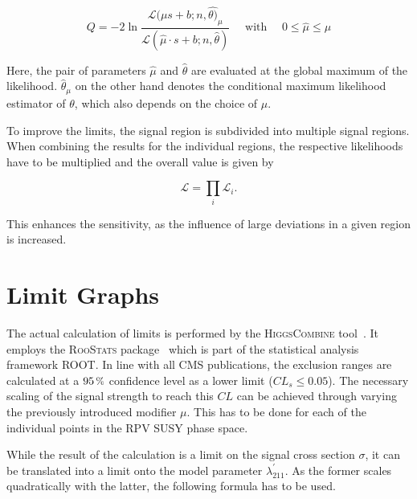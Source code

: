\begin{equation}
  \label{eq:q-mod}
  Q = - 2 \ln{ \frac{\mathcal{L} (\mu s + b; n, \hat{\theta)}_\mu }{\mathcal{L} (\hat{\mu} \cdot s + b; n, \hat{\theta} )} } \quad \text{ with } \quad 0 \leq \hat{\mu} \leq \mu
\end{equation}

\noindent Here, the pair of parameters $\hat{\mu}$ and $\hat{\theta}$ are evaluated at the global maximum of the likelihood. $\hat{\theta}_\mu$ on the other hand denotes the conditional maximum likelihood estimator of $\theta$, which also depends on the choice of $\mu$.


To improve the limits, the signal region is subdivided into multiple signal regions. When combining the results for the individual regions, the respective likelihoods have to be multiplied and the overall value is given by

\begin{equation}
  \label{eq:likelihood-product}
  \mathcal{L} = \prod_i \mathcal{L}_i.
\end{equation}

\noindent This enhances the sensitivity, as the influence of large deviations in a given region is increased.

\section{Limit Graphs}
\label{sec:limit-graphs}

The actual calculation of limits is performed by the \textsc{HiggsCombine} tool~\cite{clsmod,higgscombine}. It employs the \textsc{RooStats} package~\cite{roostats} which is part of the statistical analysis framework \textsc{ROOT}. In line with all CMS publications, the exclusion ranges are calculated at a $95\,\pct$ confidence level as a lower limit ($CL_s \leq 0.05$). The necessary scaling of the signal strength to reach this $CL$ can be achieved through varying the previously introduced modifier $\mu$. This has to be done for each of the individual points in the RPV SUSY phase space.

While the result of the calculation is a limit on the signal cross section $\sigma$, it can be translated into a limit onto the model parameter $\lambda^\prime_{211}$. As the former scales quadratically with the latter, the following formula has to be used.

